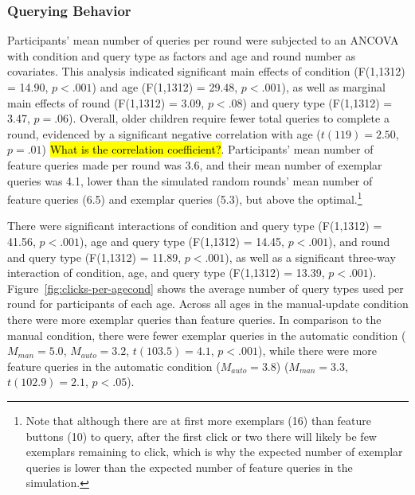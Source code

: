 \documentclass[10pt,letterpaper]{article}
\begin{document}
\subsubsection{Querying Behavior}

Participants' mean number of queries per round were subjected to an 
ANCOVA with condition and query type as factors and age and round number as 
covariates. This analysis indicated significant main effects of condition (F(1,1312) = 
14.90, $p<.001$) and age (F(1,1312) = 29.48, $p<.001$), as well as marginal main 
effects of round (F(1,1312) = 3.09, $p<.08$) and query type (F(1,1312) = 3.47, $p=.
06$). Overall, older children require fewer total queries to complete a round, 
evidenced by a significant negative correlation with age ($t(119) = 2.50$, $p=.01$) \hl{What is the correlation coefficient?}. 
Participants' mean number of feature queries made per round was 3.6, and their 
mean number of exemplar queries was 4.1, lower than the simulated random 
rounds' mean number of feature queries (6.5) and exemplar queries (5.3), but above 
the optimal.\footnote{Note that although there are at first more exemplars (16) than 
feature buttons (10) to query, after the first click or two there will likely be few 
exemplars remaining to click, which is why the expected number of exemplar 
queries is lower than the expected number of feature queries in the simulation.} 

There were significant interactions of condition and query type (F(1,1312) = 41.56, 
$p<.001$), age and query type (F(1,1312) = 14.45, $p<.001$), and round and query 
type (F(1,1312) = 11.89, $p<.001$), as well as a significant three-way interaction of 
condition, age, and query type (F(1,1312) = 13.39, $p<.001$). Figure~\ref{fig:clicks-per-agecond} 
shows the average number of query types used per round for 
participants of each age. Across all ages in the manual-update condition there were 
more exemplar queries than feature queries. In comparison to the manual condition, 
there were fewer exemplar queries in the automatic condition ($M_{man} = 5.0$, 
$M_{auto} = 3.2$, $t(103.5)=4.1$, $p<.001$), while there were more feature queries 
in the automatic condition ($M_{auto} = 3.8$) ($M_{man} = 3.3$, $t(102.9)=2.1$, 
$p<.05$). 
\end{document}

